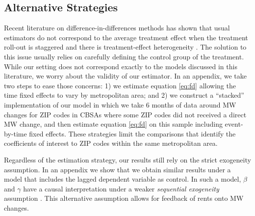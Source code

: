 \subsection{Alternative Strategies}

Recent literature on difference-in-differences methods has shown that usual
estimators do not correspond to the average treatment effect when the treatment 
roll-out is staggered and there is treatment-effect heterogeneity 
\parencite{deChaisemartinEtAl2022,RothEtAl2022}.
The solution to this issue usually relies on carefully defining the control
group of the treatment.
While our setting does not correspond exactly to the models discussed in this
literature, 
we worry about the validity of our estimator.
In an appendix, we take two steps to ease those concerns:
1) we estimate equation \eqref{eq:fd} allowing the time fixed effects to vary
by metropolitan area; and
2) we construct a ``stacked'' implementation of our model in which we take
6 months of data around MW changes for ZIP codes in CBSAs where some ZIP codes 
did not received a direct MW change, and then estimate equation \eqref{eq:fd} on
this sample including event-by-time fixed effects.
These strategies limit the comparisons that identify the coefficients of 
interest to ZIP codes within the same metropolitan area.

Regardless of the estimation strategy, our results still rely on the 
strict exogeneity assumption.
In an appendix we show that we obtain similar results under a model that 
includes the lagged dependent variable as control.
In such a model, $\beta$ and $\gamma$ have a causal interpretation under a 
weaker \textit{sequential exogeneity} assumption
\parencite{ArellanoBond1991, ArellanoHonore2001}.
This alternative assumption allows for feedback of rents onto MW changes.
